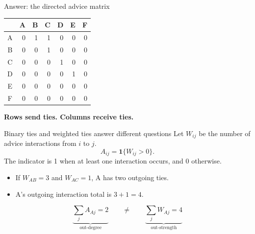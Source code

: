 \documentclass[aspectratio=169,11pt]{beamer}
\begin{document}
\begin{frame}{Answer: the directed advice matrix}
\begin{center}
\renewcommand{\arraystretch}{1.3}
\begin{tabular}{c|rrrrrr}
\toprule
 & A & B & C & D & E & F \\
\midrule
A & 0 & 1 & 1 & 0 & 0 & 0 \\
B & 0 & 0 & 1 & 0 & 0 & 0 \\
C & 0 & 0 & 0 & 1 & 0 & 0 \\
D & 0 & 0 & 0 & 0 & 1 & 0 \\
E & 0 & 0 & 0 & 0 & 0 & 0 \\
F & 0 & 0 & 0 & 0 & 0 & 0 \\
\bottomrule
\end{tabular}
\end{center}
\begin{center}\textcolor{accent}{\textbf{Rows send ties. Columns receive ties.}}\end{center}
\end{frame}

\begin{frame}{Binary ties and weighted ties answer different questions}
Let $W_{ij}$ be the number of advice interactions from $i$ to $j$.
\[A_{ij}=\mathbf{1}\{W_{ij}>0\}.\]
The indicator is 1 when at least one interaction occurs, and 0 otherwise.
\medskip
\begin{itemize}
\item If $W_{AB}=3$ and $W_{AC}=1$, A has two outgoing ties.
\medskip
\item A's outgoing interaction total is $3+1=4$.
\end{itemize}
\[\underbrace{\sum_j A_{Aj}=2}_{\text{out-degree}}\qquad\ne\qquad
\underbrace{\sum_j W_{Aj}=4}_{\text{out-strength}}\]
\end{frame}
\end{document}
